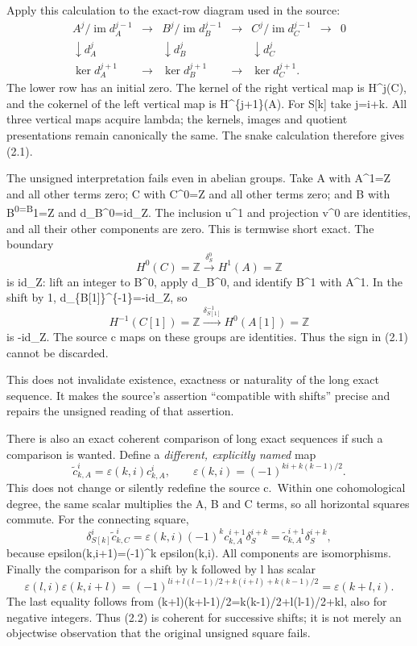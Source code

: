 Apply this calculation to the exact-row diagram used in the source: \[
\begin{array}{ccccccc}
A^j/\operatorname{im}d_A^{j-1}&\longrightarrow&
B^j/\operatorname{im}d_B^{j-1}&\longrightarrow&
C^j/\operatorname{im}d_C^{j-1}&\longrightarrow&0\\
\downarrow d_A^j&&\downarrow d_B^j&&\downarrow d_C^j\\
\ker d_A^{j+1}&\longrightarrow&
\ker d_B^{j+1}&\longrightarrow&\ker d_C^{j+1}.
\end{array}
\] The lower row has an initial zero. The kernel of the right vertical map is H\^{}j(C), and the cokernel of the left vertical map is H\^{}\{j+1\}(A). For S{[}k{]} take j=i+k. All three vertical maps acquire lambda; the kernels, images and quotient presentations remain canonically the same. The snake calculation therefore gives (2.1).

The unsigned interpretation fails even in abelian groups. Take A with A\^{}1=Z and all other terms zero; C with C\^{}0=Z and all other terms zero; and B with B\textsuperscript{0=B}1=Z and d\_B\^{}0=id\_Z. The inclusion u\^{}1 and projection v\^{}0 are identities, and all their other components are zero. This is termwise short exact. The boundary \[
H^0(C)=\mathbb Z\xrightarrow{\delta_S^0}H^1(A)=\mathbb Z
\] is id\_Z: lift an integer to B\^{}0, apply d\_B\^{}0, and identify B\^{}1 with A\^{}1. In the shift by 1, d\_\{B{[}1{]}\}\^{}\{-1\}=-id\_Z, so \[
H^{-1}(C[1])=\mathbb Z
\xrightarrow{\delta_{S[1]}^{-1}}
H^0(A[1])=\mathbb Z
\] is -id\_Z. The source c maps on these groups are identities. Thus the sign in (2.1) cannot be discarded.

This does not invalidate existence, exactness or naturality of the long exact sequence. It makes the source's assertion ``compatible with shifts'' precise and repairs the unsigned reading of that assertion.

There is also an exact coherent comparison of long exact sequences if such a comparison is wanted. Define a \emph{different, explicitly named} map \[
\widetilde c_{k,A}^i
=\varepsilon(k,i)c_{k,A}^i,\qquad
\varepsilon(k,i)=(-1)^{ki+k(k-1)/2}.                         \tag{2.2}
\] This does not change or silently redefine the source c.~Within one cohomological degree, the same scalar multiplies the A, B and C terms, so all horizontal squares commute. For the connecting square, \[
\delta_{S[k]}^i\widetilde c_{k,C}^i
=\varepsilon(k,i)(-1)^k c_{k,A}^{i+1}\delta_S^{i+k}
=\widetilde c_{k,A}^{i+1}\delta_S^{i+k},
\] because epsilon(k,i+1)=(-1)\^{}k epsilon(k,i). All components are isomorphisms. Finally the comparison for a shift by k followed by l has scalar \[
\varepsilon(l,i)\varepsilon(k,i+l)
=(-1)^{li+l(l-1)/2+k(i+l)+k(k-1)/2}
=\varepsilon(k+l,i).
\] The last equality follows from (k+l)(k+l-1)/2=k(k-1)/2+l(l-1)/2+kl, also for negative integers. Thus (2.2) is coherent for successive shifts; it is not merely an objectwise observation that the original unsigned square fails.

